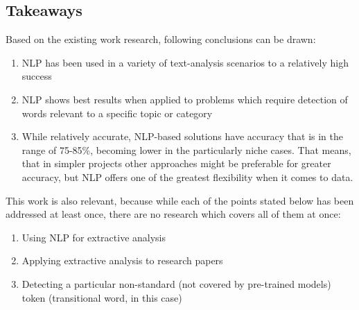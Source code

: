 \documentclass[conference]{IEEEtran}
\begin{document}
\subsection{Takeaways}

Based on the existing work research, following conclusions can be drawn:
\begin{enumerate}
    \item NLP has been used in a variety of text-analysis scenarios to a relatively high success
    \item NLP shows best results when applied to problems which require detection of words relevant to a specific topic or category
    \item While relatively accurate, NLP-based solutions have accuracy that is in the range of 75-85\%, becoming lower in the particularly niche cases. That means, that in simpler projects other approaches might be preferable for greater accuracy, but NLP offers one of the greatest flexibility when it comes to data.
\end{enumerate}

This work is also relevant, because while each of the points stated below has been addressed at least once, there are no research which covers all of them at once:

\begin{enumerate}
    \item Using NLP for extractive analysis
    \item Applying extractive analysis to research papers
    \item Detecting a particular non-standard (not covered by pre-trained models) token (transitional word, in this case)
\end{enumerate}
\end{document}
